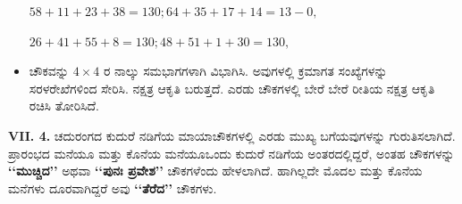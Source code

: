 \begin{itemize}
\smallskip

	$58+11+23+38=130; 64+35+17+14=13-0,$

	$26+41+55+8= 130; 48+51+1+30=130,$
	
	\smallskip
	
	\item ಚೌಕವನ್ನು $4 \times 4$ ರ ನಾಲ್ಕು ಸಮಭಾಗಗಳಾಗಿ ವಿಭಾಗಿಸಿ. ಅವುಗಳಲ್ಲಿ ಕ್ರಮಾಗತ ಸಂಖ್ಯೆ\-ಗಳನ್ನು ಸರಳರೇಖೆಗಳಿಂದ ಸೇರಿಸಿ. ನಕ್ಷತ್ರ ಆಕೃತಿ ಬರುತ್ತದೆ. ಎರಡು ಚೌಕ\-ಗಳಲ್ಲಿ ಬೇರೆ ಬೇರೆ ರೀತಿಯ ನಕ್ಷತ್ರ ಆಕೃತಿ ರಚಿಸಿ ತೋರಿಸಿದೆ.
\end{itemize}

\textbf{VII. 4.} ಚದುರಂಗದ ಕುದುರೆ ನಡಿಗೆಯ ಮಾಯಾಚೌಕಗಳಲ್ಲಿ ಎರಡು ಮುಖ್ಯ ಬಗೆಯವುಗಳನ್ನು ಗುರುತಿಸಲಾಗಿದೆ. ಪ್ರಾರಂಭದ ಮನೆಯೂ ಮತ್ತು ಕೊನೆಯ ಮನೆಯೂ\break ಒಂದು ಕುದುರೆ ನಡಿಗೆಯ ಅಂತರದಲ್ಲಿದ್ದರೆ, ಅಂತಹ ಚೌಕಗಳನ್ನು  \textbf{‘‘ಮುಚ್ಚಿದ’’} ಅಥವಾ \textbf{‘‘ಪುನಃ ಪ್ರವೇಶ’’} ಚೌಕಗಳೆಂದು ಹೇಳಲಾಗಿದೆ. ಹಾಗಿಲ್ಲದೇ ಮೊದಲ ಮತ್ತು ಕೊನೆಯ ಮನೆಗಳು ದೂರವಾಗಿದ್ದರೆ ಅವು \textbf{‘‘ತೆರೆದ’’} ಚೌಕಗಳು.

